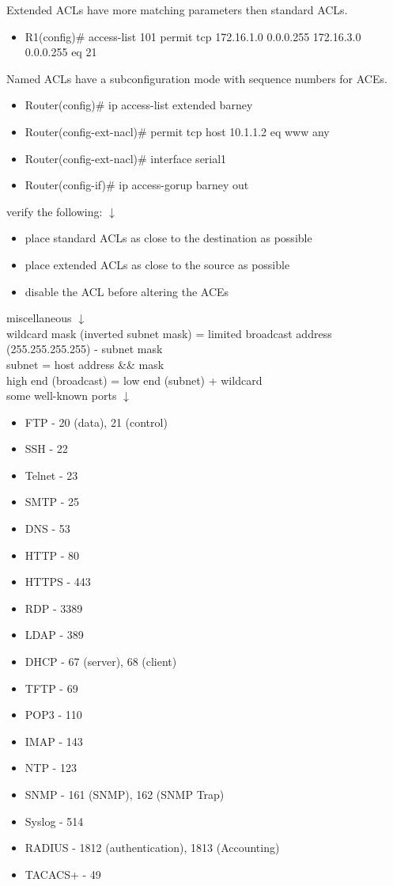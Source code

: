 \documentclass{article}
\begin{document}
Extended ACLs have more matching parameters then standard ACLs.
\begin{itemize}
\item R1(config)\# access-list 101 permit tcp 172.16.1.0 0.0.0.255 172.16.3.0 0.0.0.255 eq 21
\end{itemize}
		
Named ACLs have a subconfiguration mode with sequence numbers for ACEs.
\begin{itemize}
\item Router(config)\# ip access-list extended barney
\item Router(config-ext-nacl)\# permit tcp host 10.1.1.2 eq www any
\item Router(config-ext-nacl)\# interface serial1
\item Router(config-if)\# ip access-gorup barney out
\end{itemize}	
	
verify the following: $\downarrow$
\begin{itemize}
\item place standard ACLs as close to the destination as possible
\item place extended ACLs as close to the source as possible
\item disable the ACL before altering the ACEs
\end{itemize}
		
miscellaneous $\downarrow$\\

wildcard mask (inverted subnet mask) = limited broadcast address (255.255.255.255) - subnet mask\\
subnet = host address \&\& mask\\
high end (broadcast) = low end (subnet) + wildcard\\

some well-known ports $\downarrow$
\begin{itemize}
\item FTP - 20 (data), 21 (control)
\item SSH - 22
\item Telnet - 23
\item SMTP - 25
\item DNS - 53
\item HTTP - 80 
\item HTTPS - 443
\item RDP - 3389
\item LDAP - 389
\item DHCP - 67 (server), 68 (client)
\item TFTP - 69
\item POP3 - 110
\item IMAP - 143
\item NTP - 123
\item SNMP - 161 (SNMP), 162 (SNMP Trap)
\item Syslog - 514
\item RADIUS - 1812 (authentication), 1813 (Accounting)
\item TACACS+ - 49
\end{itemize}
		
\end{document}
